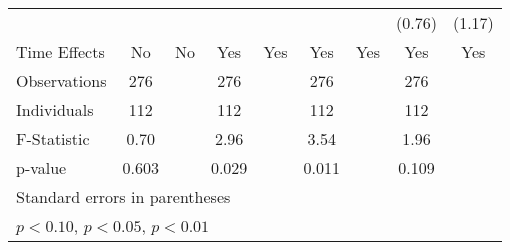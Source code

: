 \begin{table}[htbp]
\begin{tabular}{l*{8}{c}}
                              &             &             &             &             &             &             &(0.76)        &(1.17)        \\
Time Effects                  &   No        &   No        &  Yes        &  Yes        &  Yes        &  Yes        &  Yes        &  Yes        \\
\midrule
Observations                  &  276        &             &  276        &             &  276        &             &  276        &             \\
Individuals                   &  112        &             &  112        &             &  112        &             &  112        &             \\
F-Statistic                   & 0.70        &             & 2.96        &             & 3.54        &             & 1.96        &             \\
p-value                       &0.603        &             &0.029        &             &0.011        &             &0.109        &             \\
\bottomrule
\multicolumn{9}{l}{\footnotesize Standard errors in parentheses}\\
\multicolumn{9}{l}{\footnotesize \sym{^+} \(p<0.10\), \sym{*} \(p<0.05\), \sym{**} \(p<0.01\)}\\
\end{tabular}
\end{table}
